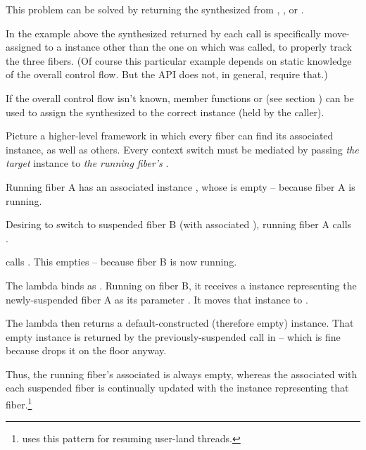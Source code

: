 This problem can be solved by returning the synthesized \fiber from \resume,
\resumewith, \xtresume or \xtresumewith.

In the example above the synthesized \fiber returned by each \resume call is
specifically move-assigned to a \fiber instance other than the one on which \resume
was called, to properly track the three fibers. (Of course this particular example
depends on static knowledge of the overall control flow. But the API does not, in
general, require that.)

\xspace\newline

If the overall control flow isn't known, member functions \resumewith
or \xtresumewith (see section ) can be used to assign the
synthesized \fiber to the correct \fiber instance (held by the caller).

Picture a higher-level framework in which every fiber can find its associated
 instance, as well as others. Every context switch must be mediated by
passing \emph{the target}  instance to \emph{the running fiber's}
.

Running fiber A has an associated  instance ,
whose \fiber\xspace{} is empty -- because fiber A is running.

Desiring to switch to suspended fiber B (with associated
 ), running fiber A calls\\
.

 calls .
This empties  -- because fiber B is now running.

The lambda binds  as . Running on fiber B, it
receives a \fiber instance representing the newly-suspended fiber A as its
parameter . It moves that \fiber instance to .

The lambda then returns a default-constructed (therefore empty) \fiber
instance. That empty instance is returned by the previously-suspended
\resumewith call in  -- which is fine because
 drops it on the floor anyway.

Thus, the running fiber's associated  is always empty,
whereas the  associated with each suspended fiber is continually
updated with the \fiber instance representing that
fiber.\footnote{\bfiber\cite{bfiber} uses this pattern for resuming user-land
threads.}

